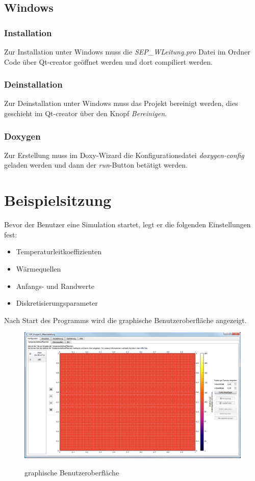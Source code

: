 \subsection{Windows}
\subsubsection{Installation}
Zur Installation unter Windows muss die \emph{SEP\_WLeitung.pro} Datei im Ordner Code über Qt-creator geöffnet werden und dort compiliert werden.
\subsubsection{Deinstallation}
Zur Deinstallation unter Windows muss das Projekt bereinigt werden, dies geschieht im Qt-creator über den Knopf \emph{Bereinigen}.
\subsubsection{Doxygen}
Zur Erstellung muss im Doxy-Wizard die Konfigurationsdatei \emph{doxygen-config} geladen werden und dann der \emph{run}-Button betätigt werden.

\newpage
\section{Beispielsitzung}

Bevor der Benutzer eine Simulation startet, legt er die folgenden Einstellungen fest:
\begin{itemize}
\item Temperaturleitkoeffizienten
\item Wärmequellen
\item Anfangs- und Randwerte
\item Diskretisierungsparameter
\end{itemize}
\noindent
Nach Start des Programms wird die graphische Benutzeroberfläche angezeigt.
\begin{figure}[H]
\centering
\includegraphics[scale=.5]{Benutzerdokumentation/StartAnzeige.png}\\
\caption{graphische Benutzeroberfläche}
\label{graphische Benutzeroberfläche}
\end{figure}


